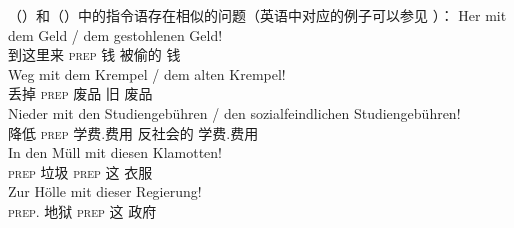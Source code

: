 \begin{exe}
\begin{xlist}[iv.]
\begin{exe}
\begin{xlist}[iv.]
（）和（）中的指令语存在相似的问题（英语中对应的例子可以参见 ）：
\eal
\label{Beispiel-Direktiva}
\ex 
\gll Her  mit  dem Geld   / dem gestohlenen Geld!\\
     到这里来 \textsc{prep}  钱 {}  被偷的 钱\\
\ex 
\gll Weg  mit  dem Krempel / dem alten Krempel!\\
     丢掉 \textsc{prep}  废品   {}  旧 废品\\
\ex 
\gll Nieder mit den Studiengebühren / den sozialfeindlichen Studiengebühren!\\
     降低 \textsc{prep}  学费.费用  {}  反社会的 学费.费用\\
\zl
\eal
\ex 
\gll In den Müll mit diesen Klamotten!\\
     \textsc{prep}  垃圾 \textsc{prep} 这 衣服\\
\ex 
\gll Zur Hölle mit dieser Regierung!\\
	 \textsc{prep}. 地狱 \textsc{prep} 这 政府\\

\end{xlist}
\end{exe}
\end{xlist}
\end{exe}
